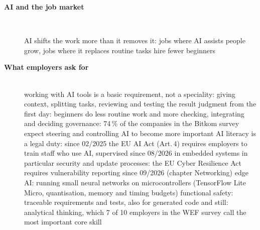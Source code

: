 \begin{description}
\item[{\rot\bf AI and the job market}]~\\[-\lblskip]
\begin{center}
\end{center}
\bi
	\ite AI shifts the work more than it removes it: jobs where AI assists people grow, jobs where it replaces routine tasks hire fewer beginners
\ei
\os{\newpage}

\item[{\rot\bf What employers ask for}]~\\[-\lblskip]
\bi
	\ite working with AI tools is a basic requirement, not a speciality: giving context, splitting tasks, reviewing and testing the result
	\ite judgment from the first day: beginners do less routine work and more checking, integrating and deciding
	\ite governance: 74\,\% of the companies in the Bitkom survey expect steering and controlling AI to become more important \cite{bitkom2026}
	\ite AI literacy is a legal duty: since 02/2025 the EU AI Act (Art.\,4) requires employers to train staff who use AI, supervised since 08/2026 \cite{euaiact}
	\ite in embedded systems in particular
	\bi
		\ite security and update processes: the EU Cyber Resilience Act requires vulnerability reporting since 09/2026 (chapter Networking)
		\ite edge AI: running small neural networks on microcontrollers (TensorFlow Lite Micro, quantisation, memory and timing budgets)
		\ite functional safety: traceable requirements and tests, also for generated code
	\ei
	\ite and still: analytical thinking, which 7 of 10 employers in the WEF survey call the most important core skill \cite{wef2025}
\ei
\os{\newpage}


\end{description}
